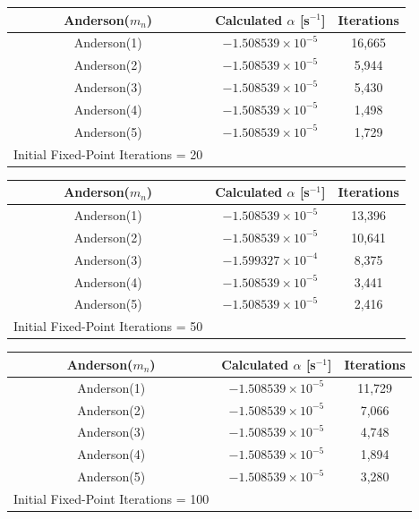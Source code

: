 \begin{table}[!htbp]\ContinuedFloat
	\begin{subtable}[h]{1.0\textwidth}
	\centering{}
	\begin{tabular}{@{}ccc@{}}\toprule
	Anderson($m_{n}$) & Calculated $\alpha$ [s$^{-1}$] & Iterations \\
	\midrule
	Anderson(1) & $-1.508539 \times 10^{-5}$ & 16,665 \\
	Anderson(2) & $-1.508539 \times 10^{-5}$ & 5,944 \\
	Anderson(3) & $-1.508539 \times 10^{-5}$ & 5,430 \\
	Anderson(4) & $-1.508539 \times 10^{-5}$ & 1,498 \\
	Anderson(5) & $-1.508539 \times 10^{-5}$ & 1,729 \\
	\bottomrule
	Initial Fixed-Point Iterations = 20
	\end{tabular}
	\end{subtable}%
	\vspace{0.25cm}
	\begin{subtable}[h]{1.0\textwidth}
	\centering{}
	\begin{tabular}{@{}ccc@{}}\toprule
	Anderson($m_{n}$) & Calculated $\alpha$ [s$^{-1}$] & Iterations \\
	\midrule
	Anderson(1) & $-1.508539 \times 10^{-5}$ & 13,396 \\
	Anderson(2) & $-1.508539 \times 10^{-5}$ & 10,641 \\
	Anderson(3) & $-1.599327 \times 10^{-4}$ & 8,375 \\
	Anderson(4) & $-1.508539 \times 10^{-5}$ & 3,441 \\
	Anderson(5) & $-1.508539 \times 10^{-5}$ & 2,416 \\
	\bottomrule
	Initial Fixed-Point Iterations = 50
	\end{tabular}
	\end{subtable}%
	\vspace{0.25cm}
	\begin{subtable}[h]{1.0\textwidth}
	\centering{}
	\begin{tabular}{@{}ccc@{}}\toprule
	Anderson($m_{n}$) & Calculated $\alpha$ [s$^{-1}$] & Iterations \\
	\midrule
	Anderson(1) & $-1.508539 \times 10^{-5}$ & 11,729 \\
	Anderson(2) & $-1.508539 \times 10^{-5}$ & 7,066 \\
	Anderson(3) & $-1.508539 \times 10^{-5}$ & 4,748 \\
	Anderson(4) & $-1.508539 \times 10^{-5}$ & 1,894 \\
	Anderson(5) & $-1.508539 \times 10^{-5}$ & 3,280 \\
	\bottomrule
	Initial Fixed-Point Iterations = 100
	\end{tabular}
	\end{subtable}
\end{table}

